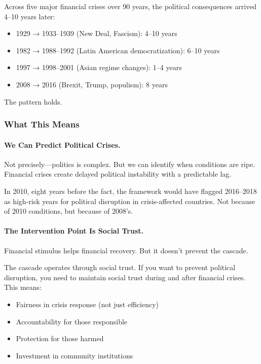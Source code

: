 Across five major financial crises over 90 years, the political consequences 
arrived 4--10 years later:

\begin{itemize}
    \item 1929 → 1933--1939 (New Deal, Fascism): 4--10 years
    \item 1982 → 1988--1992 (Latin American democratization): 6--10 years
    \item 1997 → 1998--2001 (Asian regime changes): 1--4 years
    \item 2008 → 2016 (Brexit, Trump, populism): 8 years
\end{itemize}

The pattern holds.

\subsubsection{What This Means}

\paragraph{We Can Predict Political Crises.}

Not precisely---politics is complex. But we can identify when conditions 
are ripe. Financial crises create delayed political instability with 
a predictable lag.

In 2010, eight years before the fact, the framework would have flagged 
2016--2018 as high-risk years for political disruption in crisis-affected 
countries. Not because of 2010 conditions, but because of 2008's.

\paragraph{The Intervention Point Is Social Trust.}

Financial stimulus helps financial recovery. But it doesn't prevent 
the cascade.

The cascade operates through social trust. If you want to prevent 
political disruption, you need to maintain social trust during and 
after financial crises. This means:

\begin{itemize}
    \item Fairness in crisis response (not just efficiency)
    \item Accountability for those responsible
    \item Protection for those harmed
    \item Investment in community institutions
\end{itemize}

